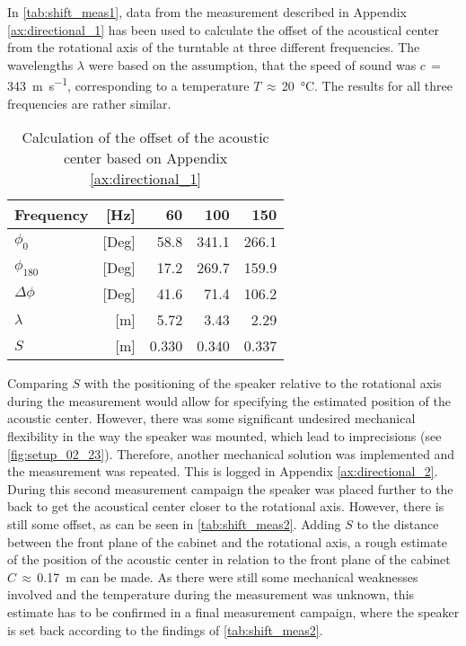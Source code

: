 In \autoref{tab:shift_meas1}, data from the measurement described in Appendix \ref{ax:directional_1} has been used to calculate the offset of the acoustical center from the rotational axis of the turntable at three different frequencies. The wavelengths \(\lambda\) were based on the assumption, that the speed of sound was \(c\,=\,\)\SI{343}{\meter\per\second}, corresponding to a temperature \(T\,\approx\,\)\SI{20}{\celsius}. The results for all three frequencies are rather similar.
\begin{table}[H]
\centering
\caption{Calculation of the offset of the acoustic center based on Appendix \ref{ax:directional_1}}
\label{tab:shift_meas1}
\begin{tabular}{|lr|r|r|r|}
\hline
Frequency              & {[}Hz{]}  & 60    & 100    & 150    \\ \hline
\(\phi_0\)             & {[}Deg{]} & 58.8  & 341.1  & 266.1  \\ \hline
\(\phi_{180}\)         & {[}Deg{]} & 17.2  & 269.7  & 159.9  \\ \hline
\(\Delta\phi\)         & {[}Deg{]} & 41.6  & 71.4   & 106.2  \\ \hline
\(\lambda\)            & {[}m{]}   & 5.72  & 3.43   & 2.29   \\ \hline
\(S\)                  & {[}m{]}   & 0.330 & 0.340  & 0.337  \\ \hline
\end{tabular}
\end{table}
Comparing \(S\) with the positioning of the speaker relative to the rotational axis during the measurement would allow for specifying the estimated position of the acoustic center. However, there was some significant undesired mechanical flexibility in the way the speaker was mounted, which lead to imprecisions (see \autoref{fig:setup_02_23}). Therefore, another mechanical solution was implemented and the measurement was repeated. This is  logged in Appendix \ref{ax:directional_2}.
During this second measurement campaign the speaker was placed further to the back to get the acoustical center closer to the rotational axis. However, there is still some offset, as can be seen in \autoref{tab:shift_meas2}.
Adding \(S\) to the distance between  the front plane of the cabinet and the rotational axis, a rough estimate of the position of the acoustic center in relation to the front plane of the cabinet \(C\,\approx\,\)\SI{0.17}{\meter} can be made. As there were still some mechanical weaknesses involved and the temperature during the measurement was unknown, this estimate has to be confirmed in a final measurement campaign, where the speaker is set back according to the findings of \autoref{tab:shift_meas2}.\\
